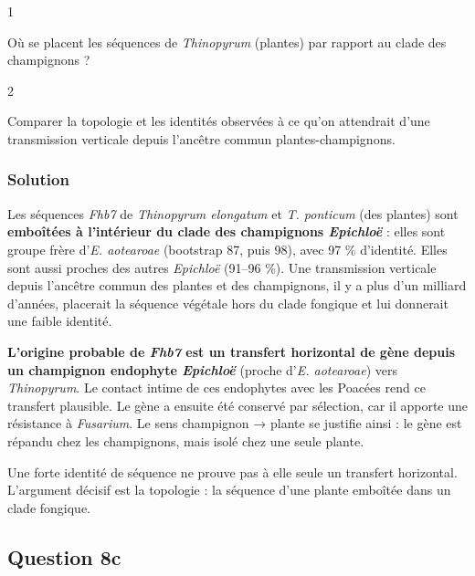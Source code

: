\documentclass[11pt,a4paper]{article}
\begin{document}
\begin{indication}{1}

Où se placent les séquences de \emph{Thinopyrum} (plantes) par rapport au clade des champignons ?

\end{indication}

\begin{indication}{2}

Comparer la topologie et les identités observées à ce qu'on attendrait d'une transmission verticale depuis l'ancêtre commun plantes-champignons.

\end{indication}

\hypertarget{solution-21}{%
\subsubsection{Solution}\label{solution-21}}

Les séquences \emph{Fhb7} de \emph{Thinopyrum elongatum} et \emph{T. ponticum} (des plantes) sont \textbf{emboîtées à l'intérieur du clade des champignons \emph{Epichloë}} : elles sont groupe frère d'\emph{E. aotearoae} (bootstrap 87, puis 98), avec 97 \% d'identité. Elles sont aussi proches des autres \emph{Epichloë} (91--96 \%). Une transmission verticale depuis l'ancêtre commun des plantes et des champignons, il y a plus d'un milliard d'années, placerait la séquence végétale hors du clade fongique et lui donnerait une faible identité.

\textbf{L'origine probable de \emph{Fhb7} est un transfert horizontal de gène depuis un champignon endophyte \emph{Epichloë}} (proche d'\emph{E. aotearoae}) vers \emph{Thinopyrum}. Le contact intime de ces endophytes avec les Poacées rend ce transfert plausible. Le gène a ensuite été conservé par sélection, car il apporte une résistance à \emph{Fusarium}. Le sens champignon → plante se justifie ainsi : le gène est répandu chez les champignons, mais isolé chez une seule plante.

\begin{piege}

Une forte identité de séquence ne prouve pas à elle seule un transfert horizontal. L'argument décisif est la topologie : la séquence d'une plante emboîtée dans un clade fongique.

\end{piege}

\hypertarget{question-8c}{%
\subsection{Question 8c}\label{question-8c}}
\end{document}
